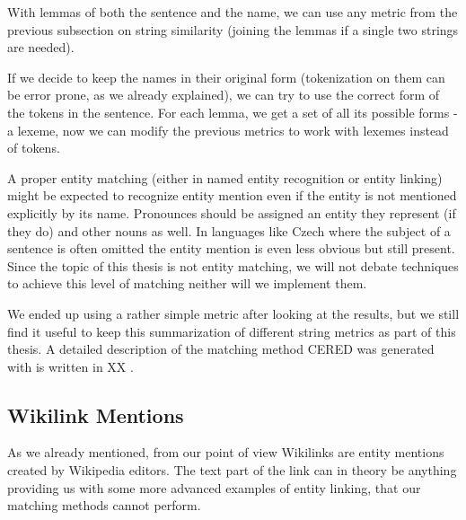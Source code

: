 With lemmas of both the sentence and the name, we can use any metric from the previous subsection on string similarity (joining the lemmas if a single two strings are needed).

If we decide to keep the names in their original form (tokenization on them can be error prone, as we already explained), we can try to use the correct form of the tokens in the sentence. For each lemma, we get a set of all its possible forms - a lexeme, now we can modify the previous metrics to work with lexemes instead of tokens. 


A proper entity matching (either in named entity recognition or entity linking) might be expected to recognize entity mention even if the entity is not mentioned explicitly by its name. Pronounces should be assigned an entity they represent (if they do) and other nouns as well. In languages like Czech where the subject of a sentence is often omitted the entity mention is even less obvious but still present. Since the topic of this thesis is not entity matching, we will not debate techniques to achieve this level of matching neither will we implement them.

\vspace{2mm}
We ended up using a rather simple metric after looking at the results, but we still find it useful to keep this summarization of different string metrics as part of this thesis. A detailed description of the matching method CERED was generated with is written in XX .


\subsection{Wikilink Mentions}

As we already mentioned, from our point of view Wikilinks are entity mentions created by Wikipedia editors. The text part of the link can in theory be anything providing us with some more advanced examples of entity linking, that our matching methods cannot perform.

